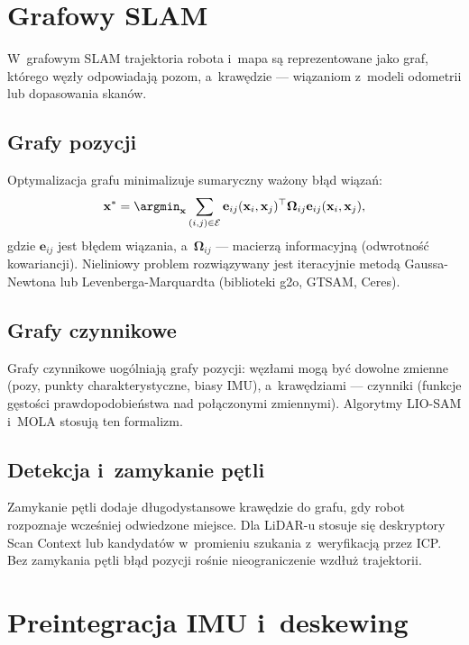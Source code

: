 \section{Grafowy SLAM}

W~grafowym SLAM trajektoria robota i~mapa są reprezentowane jako graf,
którego węzły odpowiadają pozom, a~krawędzie --- wiązaniom z~modeli odometrii
lub dopasowania skanów.

\subsection{Grafy pozycji}

Optymalizacja grafu minimalizuje sumaryczny ważony błąd wiązań:
\begin{equation}
    \mathbf{x}^* = \argmin_{\mathbf{x}} \sum_{(i,j) \in \mathcal{E}}
    \mathbf{e}_{ij}(\mathbf{x}_i, \mathbf{x}_j)^\top
    \boldsymbol{\Omega}_{ij}
    \mathbf{e}_{ij}(\mathbf{x}_i, \mathbf{x}_j),
\end{equation}
gdzie $\mathbf{e}_{ij}$ jest błędem wiązania, a~$\boldsymbol{\Omega}_{ij}$
--- macierzą informacyjną (odwrotność kowariancji).
Nieliniowy problem rozwiązywany jest iteracyjnie metodą Gaussa-Newtona
lub Levenberga-Marquardta (biblioteki g2o, GTSAM, Ceres).

\subsection{Grafy czynnikowe}

Grafy czynnikowe uogólniają grafy pozycji: węzłami mogą być dowolne zmienne
(pozy, punkty charakterystyczne, biasy IMU), a~krawędziami --- czynniki
(funkcje gęstości prawdopodobieństwa nad połączonymi zmiennymi).
Algorytmy LIO-SAM i~MOLA stosują ten formalizm.

\subsection{Detekcja i~zamykanie pętli}

Zamykanie pętli dodaje długodystansowe krawędzie do grafu, gdy robot rozpoznaje
wcześniej odwiedzone miejsce.
Dla LiDAR-u stosuje się deskryptory Scan Context lub kandydatów w~promieniu
szukania z~weryfikacją przez ICP.
Bez zamykania pętli błąd pozycji rośnie nieograniczenie wzdłuż trajektorii.

\section{Preintegracja IMU i~deskewing}

